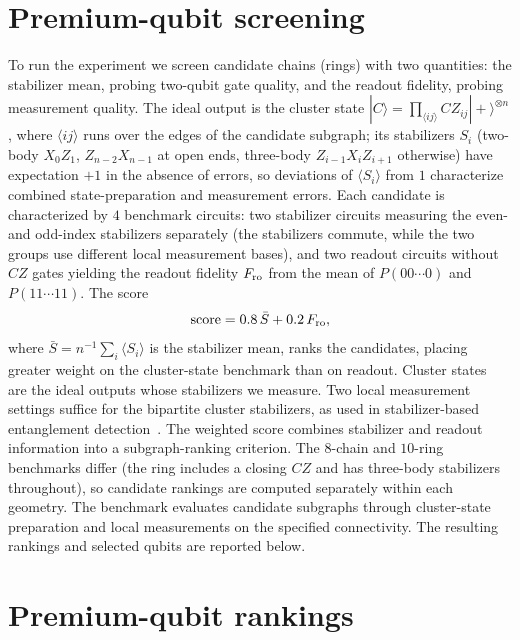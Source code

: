 \section{Premium-qubit screening}
\label{sec:premium}

To run the experiment we screen candidate chains (rings) with two
quantities: the stabilizer mean, probing two-qubit gate quality, and
the readout fidelity, probing measurement quality.
The ideal output is the cluster state
$|C\rangle=\prod_{\langle ij\rangle}CZ_{ij}|+\rangle^{\otimes n}$,
where $\langle ij\rangle$ runs over the edges of the candidate subgraph;
its stabilizers $S_i$ (two-body $X_0Z_1$, $Z_{n-2}X_{n-1}$ at open ends,
three-body $Z_{i-1}X_iZ_{i+1}$ otherwise) have expectation $+1$ in the
absence of errors, so deviations of $\langle S_i\rangle$ from $1$ characterize combined state-preparation and measurement errors.
Each candidate is characterized by $4$ benchmark circuits: two
stabilizer circuits measuring the even- and odd-index stabilizers
separately (the stabilizers commute, while the two groups use different local measurement bases),
and two readout circuits without $CZ$ gates yielding the readout
fidelity $F_{\rm ro}$ from the mean of $P(00\cdots0)$ and
$P(11\cdots11)$. The score
\begin{equation}
{\rm score}=0.8\,\bar{S}+0.2\,F_{\rm ro},
\end{equation}
where $\bar{S}=n^{-1}\sum_i\langle S_i\rangle$ is the stabilizer mean,
ranks the candidates, placing greater weight on the cluster-state benchmark than on readout.
Cluster states~\cite{raussendorf2001oneway} are the ideal outputs whose stabilizers we measure.
Two local measurement settings suffice for the bipartite cluster stabilizers, as used in stabilizer-based entanglement detection~\cite{toth2005detecting}.
The weighted score combines stabilizer and readout information into a subgraph-ranking criterion.
The $8$-chain and $10$-ring benchmarks differ (the ring includes a
closing $CZ$ and has three-body stabilizers throughout), so candidate rankings are computed separately within each geometry. The benchmark evaluates candidate subgraphs through cluster-state preparation and local measurements on the specified connectivity. The resulting rankings and selected qubits are reported below.

\section{Premium-qubit rankings}
\label{sec:rankings}

